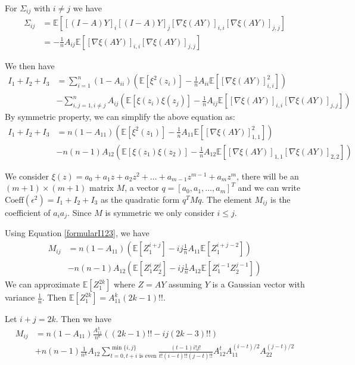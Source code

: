 \documentclass{article}
\def\E{\mathbb{E}}
\begin{document}
For $\Sigma_{ij}$ with $i\neq j$ we have
\begin{align*}
\Sigma_{ij} &=  \E[ [(I-A)Y]_i [(I-A)Y]_j [\nabla \xi(AY)]_{i,i} [\nabla \xi(AY)]_{j,j}]  \\
&= - \frac{1}{n}A_{ij} \E[[\nabla \xi(AY)]_{i,i} [\nabla \xi(AY)]_{j,j}]
\end{align*}

We then have
\begin{align*}
I_1+I_2+I_3 &= \sum_{i=1}^n (1-A_{ii})(\E[\xi^2(z_i)] -\frac{1}{n} A_{ii} \E[ [\nabla \xi(AY)]_{i,i}^2]) \\
&- \sum_{i,j=1, i \neq j}^n A_{ij} (\E[\xi(z_i)\xi(z_j)] - \frac{1}{n}A_{ij}\E[[\nabla \xi(AY)]_{i,i} [\nabla \xi(AY)]_{j,j}])
\end{align*}
By symmetric property, we can simplify the above equation as:
\begin{align}\label{formularI123}
I_1+I_2+I_3 &=n(1-A_{11})(\E[\xi^2(z_1)] - \frac{1}{n} A_{11} \E[ [\nabla \xi(AY)]_{1,1}^2]) \\
&- n(n-1)A_{12}(\E[\xi(z_1)\xi(z_2)] -  \frac{1}{n}A_{12}\E[[\nabla \xi(AY)]_{1,1} [\nabla \xi(AY)]_{2,2}])\nonumber
\end{align}

We consider $\xi(z) = a_0 + a_1 z + a_2 z^2 + \dots + a_{m-1} z^{m-1} + a_m z^m $, there will be an $(m+1) \times (m+1) $ matrix $M$, a vector  $q = [a_0, a_1, \dots, a_m]^T$ and  we can write $\textrm{Coeff}(\epsilon^2) = I_1 + I_2 + I_3$ as the quadratic form $ q^T M q $. The element $M_{ij}$ is the coefficient of $a_ia_j$. Since $M$ is symmetric we only consider $i\leq j$.

Using Equation \ref{formularI123}, we have 
\begin{align*}
M_{ij} &= n(1-A_{11}) (\E[Z_1^{i+j}] - ij \frac{1}{n}A_{11} \E[Z_1^{i+j-2}])  \\
&-n(n-1)A_{12}(\E[Z_1^i Z_2^j] - ij \frac{1}{n}A_{12}\E[Z_1^{i-1}Z_2^{j-1}])
\end{align*}
We can approximate $\E[Z_1^{2k}]$ where $Z=AY$ assuming $Y$ is a Gaussian vector with variance $\frac{1}{n}$. Then $\E[Z_1^{2k}] = A_{11}^k (2k-1)!!$.

Let $i+j=2k$. Then we have 
\begin{align*}
M_{ij} &= n(1-A_{11})\frac{A^k_{11}}{n^k}  ((2k-1)!!- ij (2k-3)!!)  \\
&+n(n-1)\frac{1}{n^k}A_{12} \sum_{t=0, t+i \textrm{ is even}}^{\min\{i,j\}} \frac{(t-1)i!j!}{t!(i-t)!!(j-t)!!} A_{12}^t A_{11}^{(i-t)/2}A_{22}^{(j-t)/2}
\end{align*}
\end{document}
